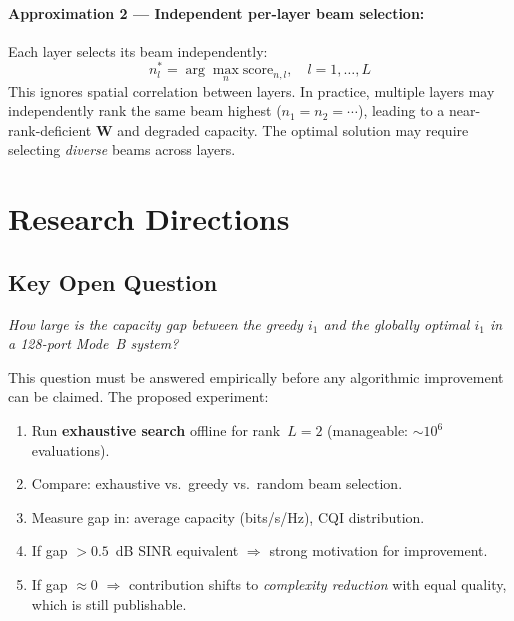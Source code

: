 \documentclass[12pt, a4paper]{article}
\newcommand{\bW}{\mathbf{W}}
\begin{document}
\paragraph{Approximation 2 — Independent per-layer beam selection:}
Each layer selects its beam independently:
\begin{equation}
    n_l^* = \arg\max_n \mathrm{score}_{n,l}, \quad l = 1, \ldots, L
\end{equation}
This ignores spatial correlation between layers. In practice, multiple layers
may independently rank the same beam highest ($n_1 = n_2 = \cdots$), leading
to a near-rank-deficient $\bW$ and degraded capacity. The optimal solution
may require selecting \emph{diverse} beams across layers.

\section{Research Directions}

\subsection{Key Open Question}

\begin{center}
\textit{How large is the capacity gap between the greedy $i_1$ and the globally
optimal $i_1$ in a 128-port Mode~B system?}
\end{center}

This question must be answered empirically before any algorithmic improvement
can be claimed. The proposed experiment:

\begin{enumerate}
    \item Run \textbf{exhaustive search} offline for rank~$L=2$ (manageable: $\sim10^6$ evaluations).
    \item Compare: exhaustive vs.\ greedy vs.\ random beam selection.
    \item Measure gap in: average capacity (bits/s/Hz), CQI distribution.
    \item If gap $> 0.5$~dB SINR equivalent $\Rightarrow$ strong motivation for improvement.
    \item If gap $\approx 0$ $\Rightarrow$ contribution shifts to \emph{complexity reduction}
          with equal quality, which is still publishable.
\end{enumerate}
\end{document}

